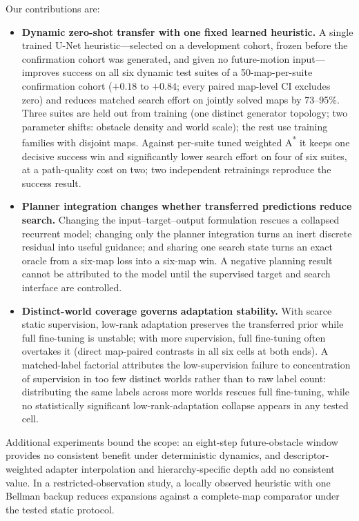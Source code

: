 \documentclass[letterpaper]{article} %
\begin{document}
Our contributions are:
\begin{itemize}
    \item \textbf{Dynamic zero-shot transfer with one fixed learned heuristic.} A single trained U-Net heuristic---selected on a development cohort, frozen before the confirmation cohort was generated, and given no future-motion input---improves success on all six dynamic test suites of a 50-map-per-suite confirmation cohort ($+0.18$ to $+0.84$; every paired map-level CI excludes zero) and reduces matched search effort on jointly solved maps by 73--95\%. Three suites are held out from training (one distinct generator topology; two parameter shifts: obstacle density and world scale); the rest use training families with disjoint maps. Against per-suite tuned weighted A\textsuperscript{*} it keeps one decisive success win and significantly lower search effort on four of six suites, at a path-quality cost on two; two independent retrainings reproduce the success result.
    \item \textbf{Planner integration changes whether transferred predictions reduce search.} Changing the input--target--output formulation rescues a collapsed recurrent model; changing only the planner integration turns an inert discrete residual into useful guidance; and sharing one search state turns an exact oracle from a six-map loss into a six-map win. A negative planning result cannot be attributed to the model until the supervised target and search interface are controlled.
    \item \textbf{Distinct-world coverage governs adaptation stability.} With scarce static supervision, low-rank adaptation preserves the transferred prior while full fine-tuning is unstable; with more supervision, full fine-tuning often overtakes it (direct map-paired contrasts in all six cells at both ends). A matched-label factorial attributes the low-supervision failure to concentration of supervision in too few distinct worlds rather than to raw label count: distributing the same labels across more worlds rescues full fine-tuning, while no statistically significant low-rank-adaptation collapse appears in any tested cell.
\end{itemize}
Additional experiments bound the scope: an eight-step future-obstacle window provides no consistent benefit under deterministic dynamics, and descriptor-weighted adapter interpolation and hierarchy-specific depth add no consistent value. In a restricted-observation study, a locally observed heuristic with one Bellman backup reduces expansions against a complete-map comparator under the tested static protocol.
\end{document}
